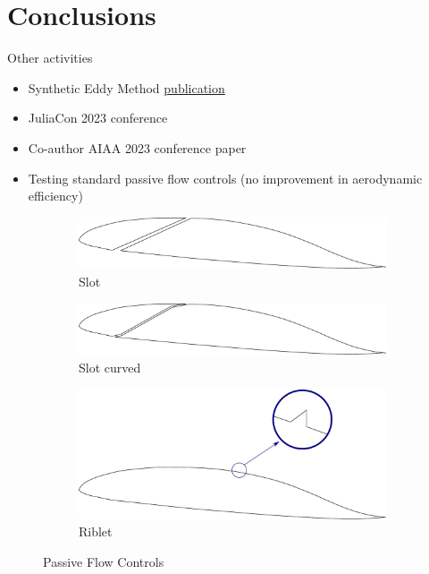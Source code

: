 \documentclass{beamer}
\begin{document}
\section{Conclusions}

\begin{frame}{Other activities}
\begin{itemize}
	\item Synthetic Eddy Method \href{https://www.theoj.org/joss-papers/joss.05565/10.21105.joss.05565.pdf}{publication}
	\item JuliaCon 2023 conference
	\item Co-author AIAA 2023 conference paper
\end{itemize}

\begin{itemize}
	\item Testing standard passive flow controls (no improvement in aerodynamic efficiency)
\end{itemize}
\begin{figure}[h]
	\centering          
	\begin{subfigure}[h]{0.30\textwidth}
			 \centering
		\includegraphics[width=\textwidth]{Slot.pdf}
		\caption{Slot}
   \end{subfigure}
   \hfill	
   \begin{subfigure}[h]{0.30\textwidth}
			\centering
	   \includegraphics[width=\textwidth]{Slot-curved.pdf}
	   \caption{Slot curved}
	\end{subfigure}
		 \hfill
	\begin{subfigure}[h]{0.30\textwidth}
	 \centering
		\includegraphics[width=\textwidth]{Riblet.pdf}
		\caption{Riblet}
	\end{subfigure}
	\caption{Passive Flow Controls}
	\end{figure} 
\end{frame}
\end{document}
